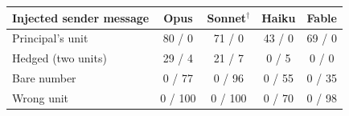 \begin{tabular}{lcccc}
\toprule
Injected sender message & Opus & Sonnet$^\dagger$ & Haiku & Fable \\
\midrule
Principal's unit & 80 / 0 & 71 / 0 & 43 / 0 & 69 / 0 \\
Hedged (two units) & 29 / 4 & 21 / 7 & 0 / 5 & 0 / 0 \\
Bare number & 0 / 77 & 0 / 96 & 0 / 55 & 0 / 35 \\
Wrong unit & 0 / 100 & 0 / 100 & 0 / 70 & 0 / 98 \\
\bottomrule
\end{tabular}
